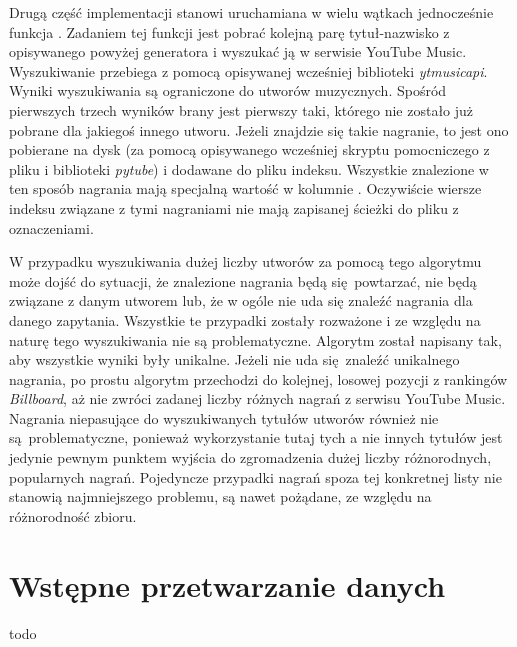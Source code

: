 Drugą część implementacji stanowi uruchamiana w wielu wątkach jednocześnie funkcja
. Zadaniem tej funkcji jest pobrać kolejną parę tytuł-nazwisko z
opisywanego powyżej generatora i wyszukać ją w serwisie YouTube Music. Wyszukiwanie przebiega z
pomocą opisywanej wcześniej biblioteki \emph{ytmusicapi}. Wyniki wyszukiwania są ograniczone do
utworów muzycznych. Spośród pierwszych trzech wyników brany jest pierwszy taki, którego
 nie zostało już pobrane dla jakiegoś innego utworu. Jeżeli znajdzie się takie
nagranie, to jest ono pobierane na dysk (za pomocą opisywanego wcześniej skryptu pomocniczego z
pliku i biblioteki \emph{pytube}) i dodawane do pliku indeksu. Wszystkie znalezione w ten sposób
nagrania mają specjalną wartość  w kolumnie . Oczywiście wiersze
indeksu związane z tymi nagraniami nie mają zapisanej ścieżki do pliku z oznaczeniami.

W przypadku wyszukiwania dużej liczby utworów za pomocą tego algorytmu może dojść do sytuacji, że
znalezione nagrania będą się powtarzać, nie będą związane z danym utworem lub, że w ogóle nie uda
się znaleźć nagrania dla danego zapytania. Wszystkie te przypadki zostały rozważone i ze względu na
naturę tego wyszukiwania nie są problematyczne. Algorytm został napisany tak, aby wszystkie wyniki
były unikalne. Jeżeli nie uda się znaleźć unikalnego nagrania, po prostu algorytm przechodzi do
kolejnej, losowej pozycji z rankingów \emph{Billboard}, aż nie zwróci zadanej liczby różnych nagrań
z serwisu YouTube Music. Nagrania niepasujące do wyszukiwanych tytułów utworów również nie
są problematyczne, ponieważ wykorzystanie tutaj tych a nie innych tytułów jest jedynie pewnym
punktem wyjścia do zgromadzenia dużej liczby różnorodnych, popularnych nagrań. Pojedyncze przypadki
nagrań spoza tej konkretnej listy nie stanowią najmniejszego problemu, są nawet pożądane, ze względu
na różnorodność zbioru.


\section{Wstępne przetwarzanie danych}
todo

